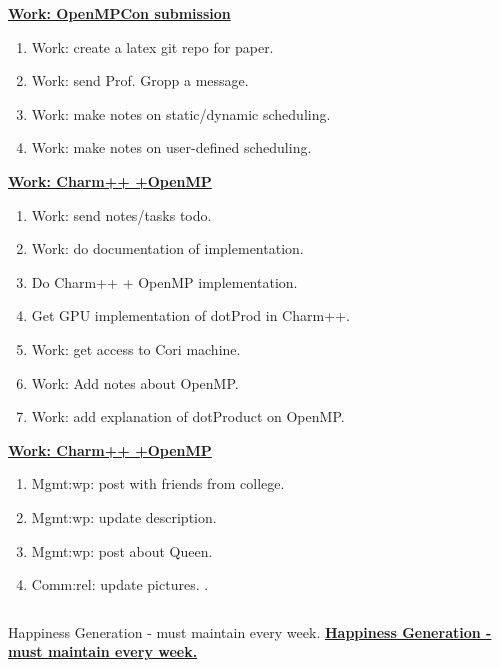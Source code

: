 \begin{multicols}{4}
\begin{minipage}{\columnwidth}
\underline{\bf \tiny {Work: OpenMPCon submission}}
\begin{enumerate}
\tiny \item \tiny Work: create a latex git repo for paper.
\item \tiny Work: send Prof. Gropp a message.
\item \tiny Work: make notes on static/dynamic scheduling.
\item \tiny Work: make notes on user-defined scheduling.
\end{enumerate}
\end{minipage}

\begin{minipage}{\columnwidth}
\underline{\bf \tiny {Work: Charm++ +OpenMP}}
\begin{enumerate}
\tiny \item \tiny Work: send notes/tasks todo.
\item \tiny Work: do documentation of implementation.
\item \tiny Do Charm++ + OpenMP implementation.
\item \tiny Get GPU implementation of dotProd in Charm++.
\item \tiny Work: get access to Cori machine.
\item \tiny Work: Add notes about OpenMP.
\item \tiny Work: add explanation of dotProduct on OpenMP.
\end{enumerate}
\end{minipage}

\begin{minipage}{\columnwidth} 
\underline{\bf \tiny {Work: Charm++ +OpenMP}}
\begin{enumerate}
\item \tiny Mgmt:wp: post with friends from college. 
\item \tiny Mgmt:wp: update description.
\item \tiny Mgmt:wp: post about Queen.
\item \tiny Comm:rel: update pictures. .
\end{enumerate}
\end{minipage}

\ifdefined\POSTER
  \begin{columns}
   \begin{column}{0.22\columnwidth}
      \begin{block}{Happiness Generation - must maintain every week.}
\else
 \underline{\bf Happiness Generation - must maintain every week.}
\fi


\end{block}
\end{column}
\end{columns}
\end{multicols}

